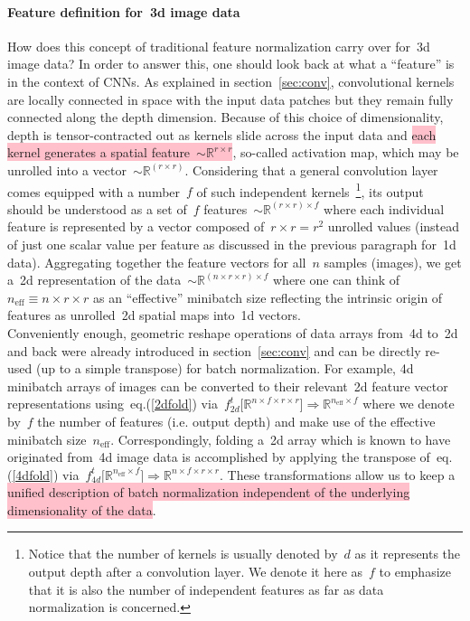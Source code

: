 \documentclass{article}
\begin{document}
\newpage

\hypertarget{3dfeature}{\paragraph{Feature definition for~3d image data}} How does this concept of traditional feature normalization carry over for~3d image data?  In order to answer this, one should look back at what a ``feature'' is in the context of CNNs.  As explained in section~\ref{sec:conv}, convolutional kernels are locally connected in space with the input data patches but they remain fully connected along the depth dimension. Because of this choice of dimensionality, depth is tensor-contracted out as kernels slide across the input data and \colorbox{pink}{each kernel generates a spatial feature~$\sim \mathbb{R}^{r\times r}$}, so-called activation map, which may be unrolled into a vector~$\sim \mathbb{R}^{(r\times r)}$.  Considering that a general convolution layer comes equipped with a number~$f$ of such independent kernels~\footnote{Notice that the number of kernels is usually denoted by~$d$ as it represents the output depth after a convolution layer. We denote it here as~$f$ to emphasize that it is also the number of independent features as far as data normalization is concerned.}, its output should be understood as a set of~$f$ features~$\sim \mathbb{R}^{(r\times r)\times f}$ where each individual feature is represented by a vector composed of~$r\times r = r^2$ unrolled values (instead of just one scalar value per feature as discussed in the previous paragraph for~1d data).  Aggregating together the feature vectors for all~$n$ samples (images), we get a~2d representation of the data~$\sim \mathbb{R}^{(n\times r\times r)\times f}$ where one can think of~$n_\text{eff} \equiv n\times r\times r$ as an ``effective'' minibatch size reflecting the intrinsic origin of features as unrolled~2d spatial maps into~1d vectors. \\

\noindent Conveniently enough, geometric reshape operations of data arrays from~4d to~2d and back were already introduced in section~\ref{sec:conv} and can be directly re-used (up to a simple transpose) for batch normalization.  For example, 4d minibatch arrays of images can be converted to their relevant~2d feature vector representations using~eq.(\ref{2dfold}) via~$f_{2d}^t \big[ \mathbb{R}^{n\times f\times r\times r} \big]  \Longrightarrow \mathbb{R}^{n_\text{eff} \times f}$ where we denote by~$f$ the number of features (i.e. output depth) and make use of the effective minibatch size~$n_\text{eff}$.  Correspondingly, folding a~2d array which is known to have originated from~4d image data is accomplished by applying the transpose of~eq.(\ref{4dfold}) via~$f_{4d}^t \big[ \mathbb{R}^{n_\text{eff}\times f} \big] \Longrightarrow \mathbb{R}^{n\times f\times r\times r}$.  These transformations allow us to keep a \colorbox{pink}{unified description of batch normalization independent of the underlying dimensionality of the data}. 
\end{document}
